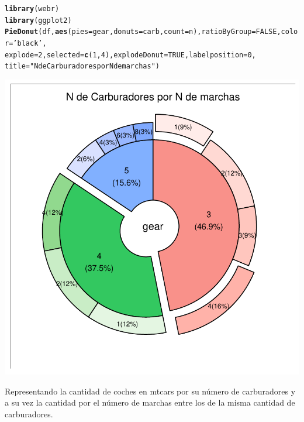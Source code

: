 \documentclass{article}\usepackage[]{graphicx}\usepackage[]{color}
\makeatletter
\def\maxwidth{ %
  \ifdim\Gin@nat@width>\linewidth
    \linewidth
  \else
    \Gin@nat@width
  \fi
}
\newcommand{\hlnum}[1]{\textcolor[rgb]{0.686,0.059,0.569}{#1}}%
\newcommand{\hlstr}[1]{\textcolor[rgb]{0.192,0.494,0.8}{#1}}%
\newcommand{\hlstd}[1]{\textcolor[rgb]{0.345,0.345,0.345}{#1}}%
\newcommand{\hlkwc}[1]{\textcolor[rgb]{0.333,0.667,0.333}{#1}}%
\newcommand{\hlkwd}[1]{\textcolor[rgb]{0.737,0.353,0.396}{\textbf{#1}}}%
\newenvironment{kframe}{%
 \def\at@end@of@kframe{}%
 \ifinner\ifhmode%
  \def\at@end@of@kframe{\end{minipage}}%
  \begin{minipage}{\columnwidth}%
 \fi\fi%
 \def\FrameCommand##1{\hskip\@totalleftmargin \hskip-\fboxsep
 \colorbox{shadecolor}{##1}\hskip-\fboxsep
     \hskip-\linewidth \hskip-\@totalleftmargin \hskip\columnwidth}%
 \MakeFramed {\advance\hsize-\width
   \@totalleftmargin\z@ \linewidth\hsize
   \@setminipage}}%
 {\par\unskip\endMakeFramed%
 \at@end@of@kframe}
\newenvironment{knitrout}{}{} %
\makeatother
\begin{document}
\begin{knitrout}
\color{fgcolor}\begin{kframe}
\begin{alltt}
\hlkwd{library}\hlstd{(webr)}
\hlkwd{library}\hlstd{(ggplot2)}
\hlkwd{PieDonut}\hlstd{(df,}\hlkwd{aes}\hlstd{(}\hlkwc{pies}\hlstd{=gear,}\hlkwc{donuts}\hlstd{=carb,}\hlkwc{count}\hlstd{=n),}\hlkwc{ratioByGroup}\hlstd{=}\hlnum{FALSE}\hlstd{,} \hlkwc{color} \hlstd{=} \hlstr{'black'}\hlstd{,}
         \hlkwc{explode} \hlstd{=} \hlnum{2}\hlstd{,} \hlkwc{selected} \hlstd{=} \hlkwd{c}\hlstd{(}\hlnum{1}\hlstd{,}\hlnum{4}\hlstd{),} \hlkwc{explodeDonut} \hlstd{=} \hlnum{TRUE}\hlstd{,} \hlkwc{labelposition}\hlstd{=}\hlnum{0}\hlstd{,}
         \hlkwc{title}\hlstd{=}\hlstr{"N de Carburadores por N de marchas"}\hlstd{)}
\end{alltt}
\end{kframe}

{\centering \includegraphics[width=\maxwidth]{figure/plot_webr-1} 

}



\end{knitrout}
Representando la cantidad de coches en mtcars por su n\'umero de carburadores y a su vez la cantidad por el n\'umero de marchas entre los de la misma cantidad de carburadores.
\clearpage
\end{document}
